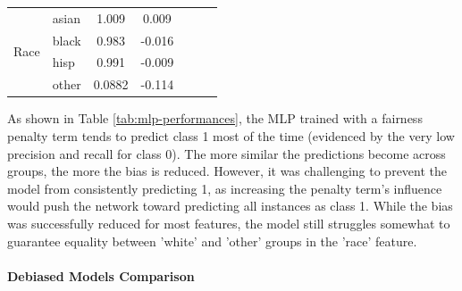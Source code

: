 \documentclass{article}
\begin{document}
\begin{table}[H]
\begin{tabular}{llcc|ccc}
\cline{1-4}
\multirow{4}{*}{Race}          & asian & 1.009                 & \multicolumn{1}{c|}{0.009} &                                       &                                    &                              \\
                            		   & black & 0.983                  & \multicolumn{1}{c|}{-0.016}  &                                       &                                    &                              \\
                            		   & hisp  & 0.991                  & \multicolumn{1}{c|}{-0.009}  &                                       &                                    &                              \\
                            		   & other & 0.0882                  & \multicolumn{1}{c|}{-0.114}  &                                       &                                    &                             
\end{tabular}
\end{table}

As shown in Table \ref{tab:mlp-performances}, the MLP trained with a fairness penalty term tends to predict class 1 most of the time (evidenced by the very low precision and recall for class 0). The more similar the predictions become across groups, the more the bias is reduced. However, it was challenging to prevent the model from consistently predicting 1, as increasing the penalty term's influence would push the network toward predicting all instances as class 1. While the bias was successfully reduced for most features, the model still struggles somewhat to guarantee equality between 'white' and 'other' groups in the 'race' feature.

\paragraph{Debiased Models Comparison}\mbox{}\\
\end{document}
